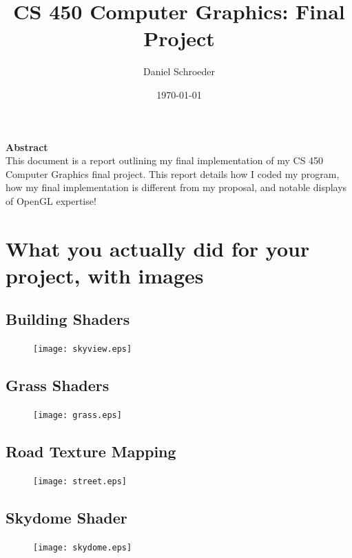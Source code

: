 \documentclass[10pt, draftclsnofoot, onecolumn]{IEEEtran}
\title{CS 450 Computer Graphics: \linebreak Final Project}
\author{Daniel Schroeder}
\date{\today}
\begin{document}
  \maketitle
  \vspace{2cm}
  \begin{center}
  \noindent \textbf{Abstract} \\
              \indent This document is a report outlining my final implementation of my CS 450 Computer Graphics final project. This report details how I coded my program, how my final implementation is different from my proposal, and notable displays of OpenGL expertise!
  \end{center}         
  
  \newpage
  \tableofcontents
  \newpage

\section{What you actually did for your project, with images}
\subsection{Building Shaders}
\begin{center} 
  \begin{figure}[H]
      \centering
      \texttt{[image: skyview.eps]}
  \end{figure}
\end{center}  
\subsection{Grass Shaders}
\begin{center} 
  \begin{figure}[H]
      \centering
      \texttt{[image: grass.eps]}
  \end{figure}
\end{center}  
\subsection{Road Texture Mapping}
\begin{center} 
  \begin{figure}[H]
      \centering
      \texttt{[image: street.eps]}
  \end{figure}
\end{center}  
\subsection{Skydome Shader}
\begin{center} 
  \begin{figure}[H]
      \centering
      \texttt{[image: skydome.eps]}
  \end{figure}
\end{center}  
\end{document}
